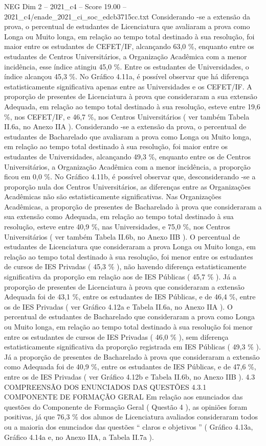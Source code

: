 \begin{textsample}{NEG Dim 2 – 2021\_c4 – Score 19.00 – 2021\_c4/enade\_2021\_ci\_soc\_edcb3715cc.txt}
Considerando -se a extensão da prova, o percentual de estudantes de Licenciatura que avaliaram a prova como Longa ou Muito longa, em relação ao tempo total destinado à sua resolução, foi maior entre os estudantes de CEFET/IF, alcançando 63,0 \%, enquanto entre os estudantes de Centros Universitários, a Organização Acadêmica com a menor incidência, esse índice atingiu 45,0 \%.
Entre os estudantes de Universidades, o índice alcançou 45,3 \%.
No Gráfico 4.11a, é possível observar que há diferença estatisticamente significativa apenas entre as Universidades e os CEFET/IF.
A proporção de presentes de Licenciatura à prova que consideraram a sua extensão Adequada, em relação ao tempo total destinado à sua resolução, esteve entre 19,6 \%, nos CEFET/IF, e 46,7 \%, nos Centros Universitários ( ver também Tabela II.6a, no Anexo IIA ).
Considerando -se a extensão da prova, o percentual de estudantes de Bacharelado que avaliaram a prova como Longa ou Muito longa, em relação ao tempo total destinado à sua resolução, foi maior entre os estudantes de Universidades, alcançando 49,3 \%, enquanto entre os de Centros Universitários, a Organização Acadêmica com a menor incidência, a proporção ficou em 0,0 \%.
No Gráfico 4.11b, é possível observar que, desconsiderando -se a proporção nula dos Centros Universitários, as diferenças entre as Organizações Acadêmicas não são estatisticamente significativas.
Nas Organizações Acadêmicas, a proporção de presentes de Bacharelado à prova que consideraram a sua extensão como Adequada, em relação ao tempo total destinado à sua resolução, esteve entre 40,9 \%, nas Universidades, e 75,0 \%, nos Centros Universitários ( ver também Tabela II.6b, no Anexo IIB ).
O percentual de estudantes de Licenciatura que consideraram a prova Longa ou Muito longa, em relação ao tempo total destinado à sua resolução, foi menor entre os estudantes de cursos de IES Privadas ( 45,3 \% ), não havendo diferença estatisticamente significativa da proporção em relação aos de IES Públicas ( 45,7 \% ).
Já a proporção de presentes de Licenciatura à prova que consideraram a extensão Adequada foi de 43,1 \%, entre os estudantes de IES Públicas, e de 46,4 \%, entre os de IES Privadas ( ver Gráfico 4.12a e Tabela II.6a, no Anexo IIA ).
O percentual de estudantes de Bacharelado que consideraram a prova como Longa ou Muito longa, em relação ao tempo total destinado à sua resolução foi menor entre os estudantes de cursos de IES Privadas ( 46,0 \% ), sem diferença estatisticamente significativa da proporção registrada em IES Públicas ( 49,3 \% ).
Já a proporção de presentes de Bacharelado à prova que consideraram a extensão como Adequada foi de 40,9 \%, entre os estudantes de IES Públicas, e de 47,6 \%, entre os de IES Privadas ( ver Gráfico 4.12b e Tabela II.6b, no Anexo IIB ). 4.3 COMPREENSÃO DOS ENUNCIADOS DAS QUESTÕES 4.3.1 COMPONENTE DE FORMAÇÃO GERAL Em relação aos enunciados das questões do Componente de Formação Geral ( Questão 4 ), as opiniões foram positivas, já que 76,3 \% dos alunos de Licenciatura avaliados consideraram todos ou a maioria dos enunciados das questões “ claros e objetivos ” ( Gráfico 4.13a, Gráfico 4.14a e, no Anexo IIA, a Tabela II.7a ).

\end{textsample}
